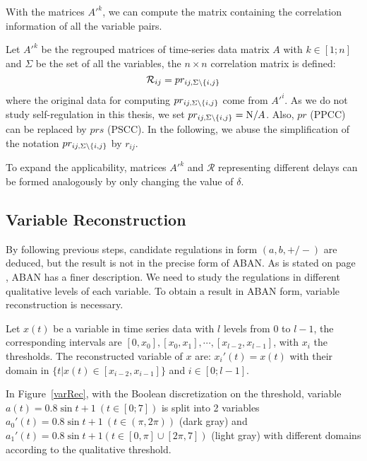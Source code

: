 With the matrices $A'^k$, we can compute the matrix containing the correlation information of all the variable pairs.

\begin{definition}\label{def:corrMatrix}
    Let $A'^k$ be the regrouped matrices of time-series data matrix $A$ with $k\in [1;n]$ and $\Sigma$ be the set of all the variables, the $n\times n$ correlation matrix is defined:
    $$\mathcal{R}_{ij}=pr_{ij,\Sigma\setminus\{i,j\}}$$ 
    where the original data for computing $pr_{ij,\Sigma\setminus\{i,j\}}$ come from $A'^i$.
    As we do not study self-regulation in this thesis, we set $pr_{ij,\Sigma\setminus\{i,j\}}=\mathrm N/A$.
    Also, $pr$ (PPCC) can be replaced by $prs$ (PSCC).
    In the following, we abuse the simplification of the notation $pr_{ij,\Sigma\setminus\{i,j\}}$ by $r_{ij}$.
\end{definition}

To expand the applicability, matrices $A'^k$ and $\mathcal{R}$ representing different delays can be formed analogously by only changing the value of $\delta$.

\subsection{Variable Reconstruction}
By following previous steps, candidate regulations in form $(a,b,+/-)$ are deduced, but the result is not in the precise form of ABAN. 
As is stated on page \pageref{par:advantage}, ABAN has a finer description.
We need to study the regulations in different qualitative levels of each variable.
To obtain a result in ABAN form, variable reconstruction is necessary.

\begin{definition}
    Let $x(t)$ be a variable in time series data with $l$ levels from $0$ to $l-1$, the corresponding intervals are $[0,x_0],[x_0,x_1],\cdots,[x_{l-2},x_{l-1}]$, with $x_i$ the thresholds. 
    The reconstructed variable of $x$ are:
        $x_i'(t)=x(t)$ with their domain in $\{t|x(t)\in [x_{i-2},x_{i-1}]\}$ and $i\in [0;l-1]$.
\end{definition}

\begin{example}
In Figure~\ref{varRec}, with the Boolean discretization on the threshold, variable $a(t)=0.8\sin t+1\ (t\in [0;7])$ is split into 2 variables $a_0'(t)=0.8\sin t+1\ (t\in (\pi,2\pi))$ (dark gray) and $a_1'(t)=0.8\sin t+1(t\in [0,\pi]\cup[2\pi,7])$ (light gray) with different domains according to the qualitative threshold.
\end{example}

